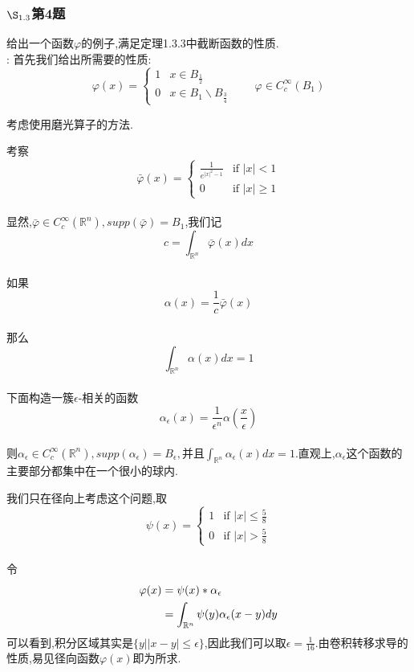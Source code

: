 \documentclass[12pt, a4paper]{ctexart}
\begin{document}
	\subsubsection{$\S_{1.3}$第4题}
	\kaishu{}给出一个函数$\varphi$的例子,满足定理1.3.3中截断函数的性质.\\
	
	\songti{}:
	首先我们给出所需要的性质:$$
	\varphi(x)=\begin{cases}
	1 &  x\in B_{\frac{1}{2}}\\
	0 &  x \in B_1 \backslash B_{\frac{3}{4}}
	\end{cases}	\qquad \varphi \in C_{c}^{\infty}(B_1)$$
	
	考虑使用磨光算子的方法.
	
	考察$$
	\bar{\varphi}(x)=	\begin{cases}
	\frac{1}{e^{|x|^2-1}} & \text{if } |x|<1\\
	0 & \text{if }  |x| \ge 1
	\end{cases}$$ \\
	显然,$\bar{\varphi} \in C_{c}^{\infty}(\mathbb{R}^n),supp(\bar{\varphi})=B_1$,我们记$$
	c=\int_{\mathbb{R}^n} \bar{\varphi}(x)dx	$$\\
	如果$$
	\alpha(x)=\frac{1}{c}\bar{\varphi}(x)	$$\\
	那么$$
	\int_{\mathbb{R}^n} \alpha(x)dx=1	$$\\
	下面构造一簇$\epsilon$-相关的函数$$
	\alpha_{\epsilon}(x)=\frac{1}{\epsilon^n}\alpha\left(\frac{x}{\epsilon}\right)	$$\\
	则$\alpha_{\epsilon} \in C_{c}^{\infty}(\mathbb{R}^n),supp(\alpha_{\epsilon})=B_{\epsilon},\text{并且}\int_{\mathbb{R}^n} \alpha_{\epsilon}(x)dx=1$.直观上,$\alpha_{\epsilon}$这个函数的主要部分都集中在一个很小的球内.
	
	我们只在径向上考虑这个问题,取$$
	\psi(x)=	\begin{cases}
	1 & \text{if } |x|\le \frac{5}{8}\\
	0 & \text{if }  |x| > \frac{5}{8}
	\end{cases}$$ \\
	令
	\begin{align}
		\varphi(x)&=\psi(x)\ast \alpha_{\epsilon} \notag \\
		&= \int_{\mathbb{R}^n} \psi(y) \alpha_{\epsilon}(x-y) dy  \notag
	\end{align}
	可以看到,积分区域其实是$\{ \left. y\right| |x-y| \le \epsilon \} $,因此我们可以取$\epsilon=\frac{1}{16}$.由卷积转移求导的性质,易见径向函数$\varphi(x)$即为所求.
	
\end{document}
